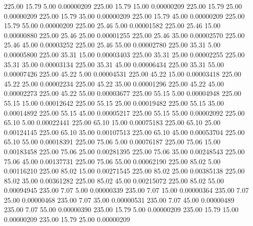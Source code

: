     225.00     15.79      5.00     0.00000209
    225.00     15.79     15.00     0.00000209
    225.00     15.79     25.00     0.00000209
    225.00     15.79     35.00     0.00000209
    225.00     15.79     45.00     0.00000209
    225.00     15.79     55.00     0.00000209
    225.00     25.46      5.00     0.00001582
    225.00     25.46     15.00     0.00000880
    225.00     25.46     25.00     0.00001255
    225.00     25.46     35.00     0.00002570
    225.00     25.46     45.00     0.00003252
    225.00     25.46     55.00     0.00002780
    225.00     35.31      5.00     0.00005800
    225.00     35.31     15.00     0.00003403
    225.00     35.31     25.00     0.00002255
    225.00     35.31     35.00     0.00003134
    225.00     35.31     45.00     0.00006434
    225.00     35.31     55.00     0.00007426
    225.00     45.22      5.00     0.00004531
    225.00     45.22     15.00     0.00003418
    225.00     45.22     25.00     0.00002234
    225.00     45.22     35.00     0.00001296
    225.00     45.22     45.00     0.00002273
    225.00     45.22     55.00     0.00003677
    225.00     55.15      5.00     0.00004948
    225.00     55.15     15.00     0.00012642
    225.00     55.15     25.00     0.00019482
    225.00     55.15     35.00     0.00014892
    225.00     55.15     45.00     0.00005217
    225.00     55.15     55.00     0.00002092
    225.00     65.10      5.00     0.00022441
    225.00     65.10     15.00     0.00075183
    225.00     65.10     25.00     0.00124145
    225.00     65.10     35.00     0.00107513
    225.00     65.10     45.00     0.00053704
    225.00     65.10     55.00     0.00018391
    225.00     75.06      5.00     0.00076187
    225.00     75.06     15.00     0.00183458
    225.00     75.06     25.00     0.00281395
    225.00     75.06     35.00     0.00248543
    225.00     75.06     45.00     0.00137731
    225.00     75.06     55.00     0.00062190
    225.00     85.02      5.00     0.00116210
    225.00     85.02     15.00     0.00271545
    225.00     85.02     25.00     0.00385138
    225.00     85.02     35.00     0.00361282
    225.00     85.02     45.00     0.00215072
    225.00     85.02     55.00     0.00094945
    235.00      7.07      5.00     0.00000339
    235.00      7.07     15.00     0.00000364
    235.00      7.07     25.00     0.00000468
    235.00      7.07     35.00     0.00000531
    235.00      7.07     45.00     0.00000489
    235.00      7.07     55.00     0.00000390
    235.00     15.79      5.00     0.00000209
    235.00     15.79     15.00     0.00000209
    235.00     15.79     25.00     0.00000209
